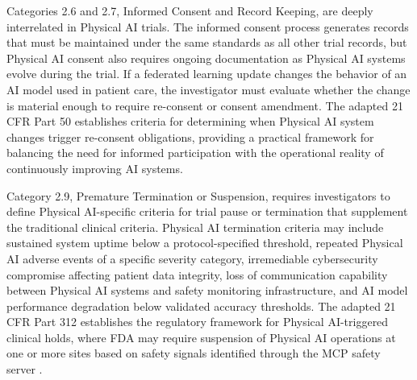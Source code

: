 Categories 2.6 and 2.7, Informed Consent and Record Keeping, are deeply
interrelated in Physical AI trials. The informed consent process generates
records that must be maintained under the same standards as all other trial
records, but Physical AI consent also requires ongoing documentation as
Physical AI systems evolve during the trial. If a federated learning update
changes the behavior of an AI model used in patient care, the investigator
must evaluate whether the change is material enough to require re-consent
or consent amendment. The adapted 21 CFR Part 50 \cite{cfr50-adapt}
establishes criteria for determining when Physical AI system changes trigger
re-consent obligations, providing a practical framework for balancing the
need for informed participation with the operational reality of continuously
improving AI systems.

Category 2.9, Premature Termination or Suspension, requires investigators
to define Physical AI-specific criteria for trial pause or termination that
supplement the traditional clinical criteria. Physical AI termination
criteria may include sustained system uptime below a protocol-specified
threshold, repeated Physical AI adverse events of a specific severity
category, irremediable cybersecurity compromise affecting patient data
integrity, loss of communication capability between Physical AI systems and
safety monitoring infrastructure, and AI model performance degradation below
validated accuracy thresholds. The adapted 21 CFR Part 312 \cite{cfr312-adapt}
establishes the regulatory framework for Physical AI-triggered clinical
holds, where FDA may require suspension of Physical AI operations at one or
more sites based on safety signals identified through the MCP safety server
\cite{national-mcp-paper}.

